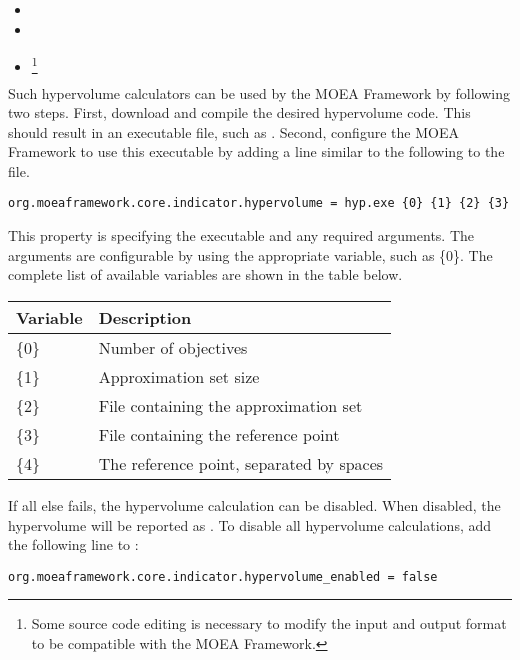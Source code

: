 \begin{itemize}
  \item {}
  \item {}
  \item {}\footnote{Some source code editing is necessary to modify the input and output format to be compatible with the MOEA Framework.}
\end{itemize}

Such hypervolume calculators can be used by the MOEA Framework by following two steps.  First, download and compile the desired hypervolume code.  This should result in an executable file, such as .  Second, configure the MOEA Framework to use this executable by adding a line similar to the following to the  file.

\begin{lstlisting}[language=Plaintext]
org.moeaframework.core.indicator.hypervolume = hyp.exe {0} {1} {2} {3}
\end{lstlisting}

This property is specifying the executable and any required arguments.  The arguments are configurable by using the appropriate variable, such as \{0\}.  The complete list of available variables are shown in the table below.

\begin{center}
\begin{tabular}{ll}
  Variable & Description \\
  \hline
  \{0\} & Number of objectives \\
  \{1\} & Approximation set size \\
  \{2\} & File containing the approximation set \\
  \{3\} & File containing the reference point \\
  \{4\} & The reference point, separated by spaces
\end{tabular}
\end{center}

If all else fails, the hypervolume calculation can be disabled.  When disabled, the hypervolume will be reported as .  To disable all hypervolume calculations, add the following line to :

\begin{lstlisting}[language=Plaintext]
org.moeaframework.core.indicator.hypervolume_enabled = false
\end{lstlisting}
